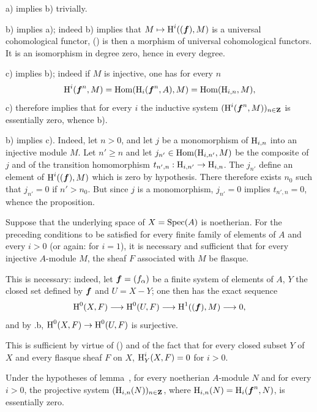 a) implies b) trivially.

b) implies a); indeed b) implies that $M\mto\H^i((\bbf), M)$ is a universal cohomological functor, () is then a morphism of universal cohomological functors. It is an isomorphism in degree zero, hence in every degree.

c) implies b); indeed if $M$ is injective, one has for every $n$
\begin{equation*} \operatorname{H}^i(\boldsymbol{f}^n, M)=\operatorname{Hom}(\operatorname{H}_i(\boldsymbol{f}^n, A), M) = \operatorname{Hom}(\operatorname{H}_{i, n}, M),
\end{equation*}
c) therefore implies that for every $i$ the inductive system $(\operatorname{H}^i(\boldsymbol{f}^n, M))_{n\in\mathbf{Z}}$ is essentially zero, whence b).

b) implies c). Indeed, let $n>0$, and let $j$ be a monomorphism of $\operatorname{H}_{i, n}$ into an injective module $M$. Let $n'\geq n$ and let $j_{n'}\in\operatorname{Hom}(\operatorname{H}_{i, n'}, M)$ be the composite of $j$ and of the transition homomorphism $t_{n', n}:\H_{i, n'}\to\H_{i, n}$. The $j_{n'}$ define an element of $\operatorname{H}^i((\boldsymbol{f}), M)$ which is zero by hypothesis. There therefore exists $n_0$ such that $j_{n'}=0$ if $n'>n_0$. But since $j$ is a monomorphism, $j_{n'}=0$ implies $t_{n', n}=0$, whence the proposition.

\begin{supcorollary} \label{II.10} Suppose that the underlying space of $X=\operatorname{Spec}(A)$ is noetherian. For the preceding conditions to be satisfied for every finite family of elements of $A$ and every $i>0$ (or again: for $i=1$), it is necessary and sufficient that for every injective $A$-module $M$, the sheaf $F$ associated with $M$ be flasque.
\end{supcorollary}

This is necessary: indeed, let $\boldsymbol{f}=(f_{\alpha})$ be a finite system of elements of $A$, $Y$ the closed set defined by $\boldsymbol{f}$ and $U=X-Y$; one then has the exact sequence
\begin{equation*} \H^0(X, F) \to \H^0(U, F) \to \H^1((\bbf), M) \to 0,
\end{equation*}
and by .b, $\H^0(X, F)\to\H^0(U, F)$ is surjective.

This is sufficient by virtue of () and of the fact that for every closed subset $Y$ of $X$ and every flasque sheaf $F$ on $X$, $\operatorname{H}_Y^i(X, F)=0$ for $i>0$.

\begin{suplemma} \label{II.11} Under the hypotheses of lemma~, for every noetherian $A$-module $N$ and for every $i>0$, the projective system $(\operatorname{H}_{i, n}(N))_{n\in\mathbf{Z}}$, where $\operatorname{H}_{i, n}(N)=\operatorname{H}_i(\boldsymbol{f}^n, N)$, is essentially zero.
\end{suplemma}

